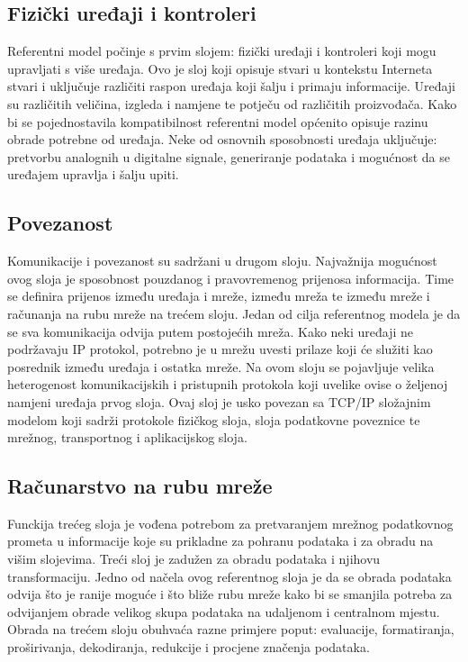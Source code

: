 \documentclass[times, utf8, diplomski]{fer}
\begin{document}
\subsection{Fizički uređaji i kontroleri}
Referentni model počinje s prvim slojem: fizički uređaji i kontroleri koji mogu upravljati s više uređaja. Ovo je sloj koji opisuje stvari u kontekstu Interneta stvari i uključuje različiti raspon uređaja koji šalju i primaju informacije. Uređaji 
su različitih veličina, izgleda i namjene te potječu od različitih proizvođača. Kako bi se pojednostavila kompatibilnost referentni model općenito opisuje razinu obrade potrebne od uređaja. Neke od osnovnih sposobnosti uređaja uključuje: pretvorbu analognih u digitalne signale, generiranje podataka i mogućnost da se uređajem upravlja i šalju upiti.

\subsection{Povezanost}
Komunikacije i povezanost su sadržani u drugom sloju. Najvažnija mogućnost ovog sloja je sposobnost pouzdanog i pravovremenog prijenosa informacija. Time se definira prijenos između uređaja i mreže, između mreža te između mreže i računanja na rubu mreže  na trećem sloju. Jedan od cilja referentnog modela je da se sva komunikacija odvija putem postojećih mreža. Kako neki uređaji ne podržavaju IP protokol, potrebno je u mrežu uvesti prilaze  koji će služiti kao posrednik između uređaja i ostatka mreže. Na ovom sloju se pojavljuje velika heterogenost komunikacijskih i pristupnih protokola koji uvelike ovise o željenoj namjeni uređaja prvog sloja. Ovaj sloj je usko povezan sa TCP/IP složajnim modelom koji sadrži protokole fizičkog sloja, sloja podatkovne poveznice te mrežnog, transportnog i aplikacijskog sloja.

\subsection{Računarstvo na rubu mreže}
Funckija trećeg sloja je vođena potrebom za pretvaranjem mrežnog podatkovnog prometa u informacije koje su prikladne za pohranu podataka i za obradu na višim slojevima. Treći sloj je zadužen za obradu podataka i njihovu transformaciju. Jedno od načela ovog referentnog sloja je da se obrada podataka odvija što je ranije moguće i što bliže rubu mreže kako bi se smanjila potreba za odvijanjem obrade velikog skupa podataka na udaljenom i centralnom mjestu. Obrada na trećem sloju obuhvaća razne primjere poput: evaluacije, formatiranja, proširivanja, dekodiranja, redukcije i procjene značenja podataka.
\end{document}
